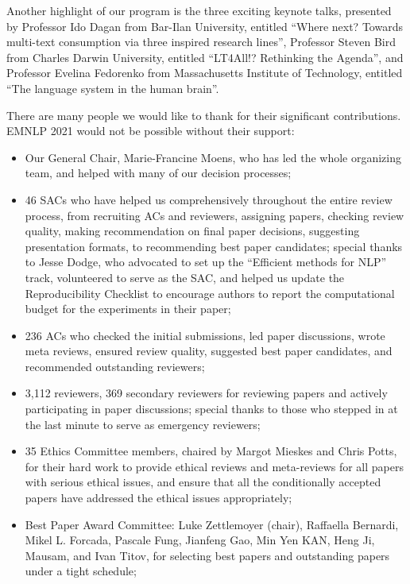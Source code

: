 Another highlight of our program is the three exciting keynote talks, presented by Professor Ido Dagan from Bar-Ilan University, entitled ``Where next? Towards multi-text consumption via three inspired research lines'', Professor Steven Bird from Charles Darwin University, entitled ``LT4All!? Rethinking the Agenda'', and Professor Evelina Fedorenko from Massachusetts Institute of Technology, entitled ``The language system in the human brain''.

There are many people we would like to thank for their significant contributions. EMNLP 2021 would not be possible without their support:

\begin{itemize}

\item Our General Chair, Marie-Francine Moens, who has led the whole organizing team, and helped with many of our decision processes;
\item 46 SACs who have helped us comprehensively throughout the entire review process, from recruiting ACs and reviewers, assigning papers, checking review quality, making recommendation on final paper decisions, suggesting presentation formats, to recommending best paper candidates; special thanks to Jesse Dodge, who advocated to set up the ``Efficient methods for NLP'' track, volunteered to serve as the SAC, and helped us update the Reproducibility Checklist to encourage authors to report the computational budget for the experiments in their paper;
\item 236 ACs who checked the initial submissions, led paper discussions, wrote meta reviews, ensured review quality, suggested best paper candidates, and recommended outstanding reviewers;
\item 3,112 reviewers, 369 secondary reviewers for reviewing papers and actively participating in paper discussions; special thanks to those who stepped in at the last minute to serve as emergency reviewers;
\item 35 Ethics Committee members, chaired by Margot Mieskes and Chris Potts, for their hard work to provide ethical reviews and meta-reviews for all papers with serious ethical issues, and ensure that all the conditionally accepted papers have addressed the ethical issues appropriately;
\item Best Paper Award Committee: Luke Zettlemoyer (chair), Raffaella Bernardi, Mikel L. Forcada, Pascale Fung, Jianfeng Gao, Min Yen KAN, Heng Ji, Mausam, and Ivan Titov, for selecting best papers and outstanding papers under a tight schedule;

\end{itemize}

